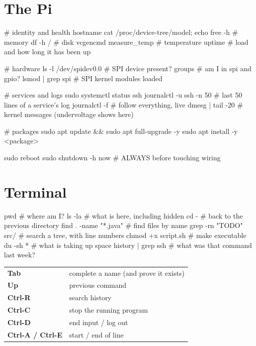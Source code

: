 \section{The Pi}

\begin{shell}
# identity and health
hostname
cat /proc/device-tree/model; echo
free -h                       # memory
df -h /                       # disk
vcgencmd measure_temp         # temperature
uptime                        # load and how long it has been up

# hardware
ls -l /dev/spidev0.0          # SPI device present?
groups                        # am I in spi and gpio?
lsmod | grep spi              # SPI kernel modules loaded

# services and logs
sudo systemctl status ssh
journalctl -u ssh -n 50       # last 50 lines of a service's log
journalctl -f                 # follow everything, live
dmesg | tail -20              # kernel messages (undervoltage shows here)

# packages
sudo apt update && sudo apt full-upgrade -y
sudo apt install -y <package>

sudo reboot
sudo shutdown -h now          # ALWAYS before touching wiring
\end{shell}

\section{Terminal}

\begin{shell}
pwd                     # where am I?
ls -la                  # what is here, including hidden
cd -                    # back to the previous directory
find . -name "*.java"   # find files by name
grep -rn "TODO" src/    # search a tree, with line numbers
chmod +x script.sh      # make executable
du -sh *                # what is taking up space
history | grep ssh      # what was that command last week?
\end{shell}

\begin{center}\small
\begin{tabular}{@{}ll@{}}
\toprule
\textbf{Tab} & complete a name (and prove it exists) \\
\textbf{Up} & previous command \\
\textbf{Ctrl-R} & search history \\
\textbf{Ctrl-C} & stop the running program \\
\textbf{Ctrl-D} & end input / log out \\
\textbf{Ctrl-A / Ctrl-E} & start / end of line \\
\bottomrule
\end{tabular}
\end{center}

